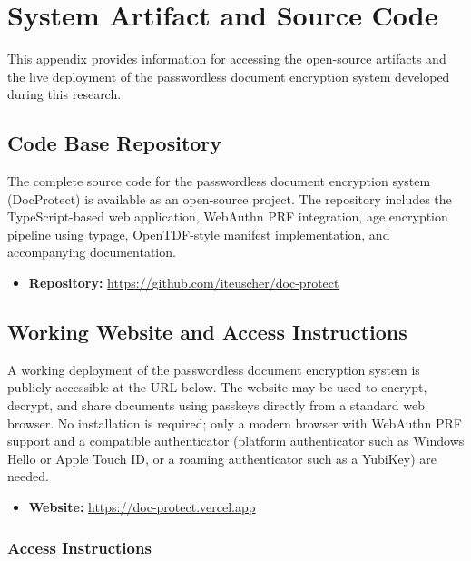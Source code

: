 \chapter{System Artifact and Source Code}
\label{ap:artifact}

This appendix provides information for accessing the open-source artifacts and the live deployment of the passwordless document encryption system developed during this research.

\section{Code Base Repository}
\label{sec:code-repository}

The complete source code for the passwordless document encryption system (DocProtect) is available as an open-source project. The repository includes the TypeScript-based web application, WebAuthn PRF integration, age encryption pipeline using typage, OpenTDF-style manifest implementation, and accompanying documentation.

\begin{itemize}
    \item \textbf{Repository:} \url{https://github.com/iteuscher/doc-protect}
\end{itemize}

\section{Working Website and Access Instructions}
\label{sec:website-access}

A working deployment of the passwordless document encryption system is publicly accessible at the URL below. The website may be used to encrypt, decrypt, and share documents using passkeys directly from a standard web browser. No installation is required; only a modern browser with WebAuthn PRF support and a compatible authenticator (platform authenticator such as Windows Hello or Apple Touch ID, or a roaming authenticator such as a YubiKey) are needed.

\begin{itemize}
    \item \textbf{Website:} \url{https://doc-protect.vercel.app}
\end{itemize}

\subsection*{Access Instructions}

